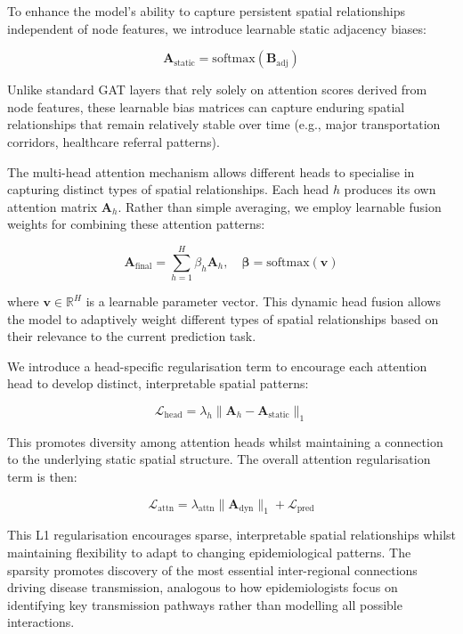 \documentclass[lettersize, journal]{IEEEtran}
\begin{document}
To enhance the model's ability to capture persistent spatial relationships independent of node features, we introduce learnable static adjacency biases:

\begin{equation}
\mathbf{A}_{\text{static}} = \text{softmax}(\mathbf{B}_{\text{adj}})
\end{equation}

Unlike standard GAT layers that rely solely on attention scores derived from node features, these learnable bias matrices can capture enduring spatial relationships that remain relatively stable over time (e.g., major transportation corridors, healthcare referral patterns).

The multi-head attention mechanism allows different heads to specialise in capturing distinct types of spatial relationships. Each head $h$ produces its own attention matrix $\mathbf{A}_h$. Rather than simple averaging, we employ learnable fusion weights for combining these attention patterns:

\begin{equation}
\mathbf{A}_{\text{final}} = \sum_{h=1}^H \beta_h \mathbf{A}_h, \quad \boldsymbol{\beta} = \text{softmax}(\mathbf{v})
\end{equation}

where $\mathbf{v} \in \mathbb{R}^H$ is a learnable parameter vector. This dynamic head fusion allows the model to adaptively weight different types of spatial relationships based on their relevance to the current prediction task.

We introduce a head-specific regularisation term to encourage each attention head to develop distinct, interpretable spatial patterns:

\begin{equation}
\mathcal{L}_{\text{head}} = \lambda_{h}\|\mathbf{A}_{h} - \mathbf{A}_{\text{static}}\|_1
\end{equation}

This promotes diversity among attention heads whilst maintaining a connection to the underlying static spatial structure. The overall attention regularisation term is then:

\begin{equation}
\mathcal{L}_{\text{attn}} = \lambda_{\text{attn}}\|\mathbf{A}_{\text{dyn}}\|_1 + \mathcal{L}_{\text{pred}}
\end{equation}

This L1 regularisation encourages sparse, interpretable spatial relationships whilst maintaining flexibility to adapt to changing epidemiological patterns. The sparsity promotes discovery of the most essential inter-regional connections driving disease transmission, analogous to how epidemiologists focus on identifying key transmission pathways rather than modelling all possible interactions.
\end{document}
